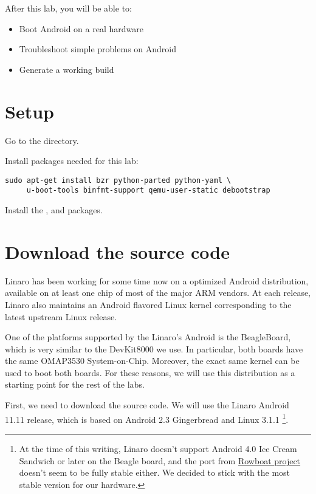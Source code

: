 
After this lab, you will be able to:
\begin{itemize}
  \item Boot Android on a real hardware
  \item Troubleshoot simple problems on Android
  \item Generate a working build
\end{itemize}

\section{Setup}

Go to the  directory.

Install packages needed for this lab:

\begin{verbatim}
sudo apt-get install bzr python-parted python-yaml \
     u-boot-tools binfmt-support qemu-user-static debootstrap
\end{verbatim}

Install the ,  and 
packages.

\section{Download the source code}

Linaro has been working for some time now on a optimized Android
distribution, available on at least one chip of most of the major ARM
vendors. At each release, Linaro also maintains an Android flavored
Linux kernel corresponding to the latest upstream Linux release.

One of the platforms supported by the Linaro's Android is the
BeagleBoard, which is very similar to the DevKit8000 we use. In
particular, both boards have the same OMAP3530 System-on-Chip.
Moreover, the exact same kernel can be used to boot both boards.
For these reasons, we will use this distribution as a
starting point for the rest of the labs.

First, we need to download the source code. We will use the Linaro
Android 11.11 release, which is based on Android 2.3 Gingerbread and
Linux 3.1.1
\footnote{At the time of this writing, Linaro doesn't support Android
  4.0 Ice Cream Sandwich or later on the Beagle board, and the port
  from \href{http://code.google.com/p/rowboat} {Rowboat project}
  doesn't seem to be fully stable either. We decided to stick with the
  most stable version for our hardware.}.

